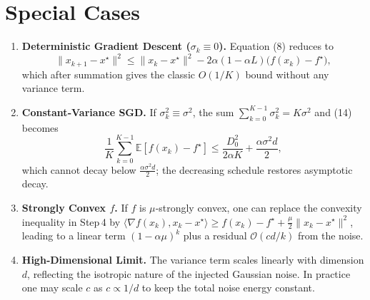 \documentclass{article}
\begin{document}
\section*{Special Cases}
\begin{enumerate}[label=\arabic*.]
\item \textbf{Deterministic Gradient Descent ($\sigma_k\equiv0$).}  
Equation (8) reduces to 
\[
\|x_{k+1}-x^\star\|^2 \le \|x_k-x^\star\|^2-2\alpha(1-\alpha L)\bigl(f(x_k)-f^\star\bigr),
\]
which after summation gives the classic $O(1/K)$ bound without any variance term.

\item \textbf{Constant‑Variance SGD.}  
If $\sigma_k^2\equiv\sigma^2$, the sum $\sum_{k=0}^{K-1}\sigma_k^2 = K\sigma^2$ and (14) becomes
\[
\frac{1}{K}\sum_{k=0}^{K-1}\mathbb{E}[f(x_k)-f^\star]\le
\frac{D_0^2}{2\alpha K}+ \frac{\alpha\sigma^2 d}{2},
\]
which cannot decay below $\frac{\alpha\sigma^2 d}{2}$; the decreasing schedule restores asymptotic decay.

\item \textbf{Strongly Convex $f$.}  
If $f$ is $\mu$‑strongly convex, one can replace the convexity inequality in Step 4 by $\langle\nabla f(x_k),x_k-x^\star\rangle\ge f(x_k)-f^\star +\frac{\mu}{2}\|x_k-x^\star\|^2$, leading to a linear term $(1-\alpha\mu)^k$ plus a residual $\mathcal{O}(c d/k)$ from the noise.

\item \textbf{High‑Dimensional Limit.}  
The variance term scales linearly with dimension $d$, reflecting the isotropic nature of the injected Gaussian noise. In practice one may scale $c$ as $c\propto 1/d$ to keep the total noise energy constant.
\end{enumerate}
\end{document}
